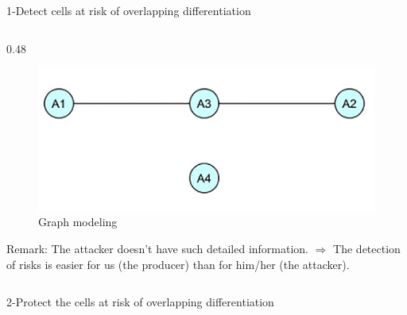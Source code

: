 \documentclass[final,xcolor={dvipsnames,svgnames,table}]{beamer}
\newlength{\colwidth}
\begin{document}
\begin{frame}[fragile,t]
\begin{columns}[t]
\begin{column}{\colwidth}
\begin{block}{1-Detect cells at risk of overlapping differentiation}
\begin{columns}
    \begin{column}{0.48\colwidth}
        \begin{figure}
            \centering
            \caption{Graph modeling}
            \includegraphics[scale=0.4]{Images/graph_representation.png}
        \end{figure}
        \vspace{-0.5cm}
        \justifying
        Remark: The attacker doesn't have such detailed information.
        $\Rightarrow$ The detection of risks is easier for us (the producer) than for him/her (the attacker).
       
    \end{column}
\end{columns}

    

    
    

  \end{block}


  \begin{block}{2-Protect the cells at risk of overlapping differentiation}


\end{block}
\end{column}
\end{columns}
\end{frame}
\end{document}
